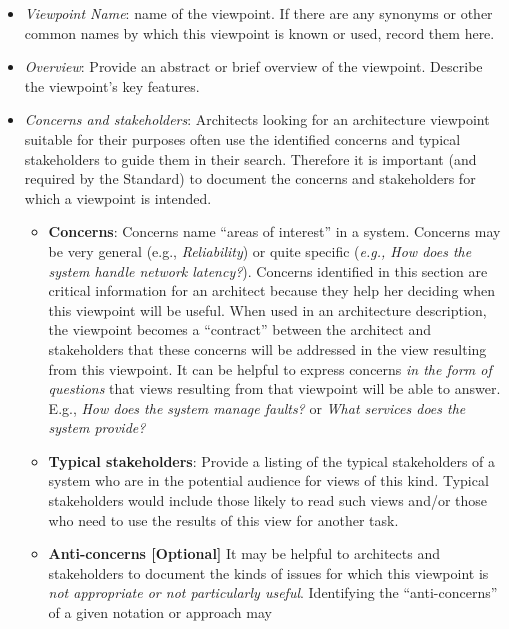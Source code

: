 \begin{itemize}
\item {\em Viewpoint Name}: name of the viewpoint. If there are any synonyms or other common names by which this viewpoint is
known or used, record them here.
\item {\em Overview}: Provide an abstract or brief overview of the viewpoint. 
Describe the viewpoint's key features.
\item {\em Concerns and stakeholders}: Architects looking for an architecture viewpoint suitable for their
purposes often use the identified concerns and typical stakeholders to
guide them in their search.  Therefore it is important (and required
by the Standard) to document the concerns and stakeholders for which a
viewpoint is intended.
\begin{itemize}
\item {\bf Concerns}: %
Concerns name ``areas of interest'' in a system.
Concerns may be very general (e.g., \textit{Reliability}) or quite
specific (\textit{e.g., How does the system handle network latency?}).
Concerns identified in this section are critical information for an
architect because they help her deciding when this viewpoint will be
useful.
When used in an architecture description, the viewpoint becomes a
``contract'' between the architect and stakeholders that these
concerns will be addressed in the view resulting from this viewpoint.
It can be helpful to express concerns \emph{in the form of questions}
that views resulting from that viewpoint will be able to answer. E.g., {\em How does the system manage faults?} or {\em What services does the system provide?}
\item {\bf Typical stakeholders}: Provide a listing of the typical stakeholders of a system who
  are in the potential audience for views of this kind.
Typical stakeholders would include those likely to read such views
and/or those who need to use the results of this view for another
task.
\item {\bf Anti-concerns [Optional]} It may be helpful to architects and stakeholders to
document the kinds of issues for which this viewpoint is \emph{not
  appropriate or not particularly useful}.
Identifying the ``anti-concerns'' of a given notation or approach may

\end{itemize}
\end{itemize}
